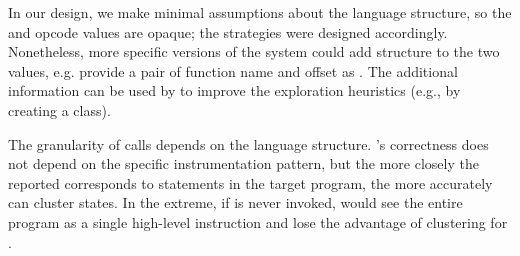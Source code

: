 In our design, we make minimal assumptions about the language structure, so the \hlpc and opcode values are opaque; the \cupa strategies were designed accordingly.  Nonetheless, more specific versions of the system could add structure to the two values, e.g. provide a pair of function name and offset as \hlpc.  The additional information can be used by \chef to improve the exploration heuristics (e.g., by creating a \cupa class).

The granularity of  calls depends on the language structure.  \chef's correctness does not depend on the specific instrumentation pattern, but the more closely the reported \hlpc corresponds to statements in the target program, the more accurately \cupa can cluster states. In the extreme, if  is never invoked, \chef would see the entire program as a single high-level instruction and lose the advantage of \cupa clustering for \hlpcs.

\fi


